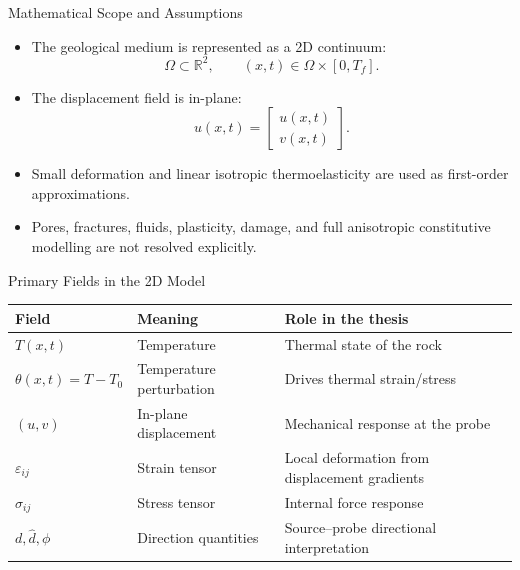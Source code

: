 \documentclass[aspectratio=169,10pt]{beamer}
\begin{document}
\begin{frame}{Mathematical Scope and Assumptions}
  \begin{itemize}
    \item The geological medium is represented as a 2D continuum:
          \[
            \Omega\subset\mathbb{R}^{2},\qquad (x,t)\in\Omega\times[0,T_f].
          \]
    \item The displacement field is in-plane:
          \[
            u(x,t)=
            \begin{bmatrix}
              u(x,t)\\
              v(x,t)
            \end{bmatrix}.
          \]
    \item Small deformation and linear isotropic thermoelasticity are used
          as first-order approximations.
    \item Pores, fractures, fluids, plasticity, damage, and full anisotropic
          constitutive modelling are not resolved explicitly.
  \end{itemize}
\end{frame}

\begin{frame}{Primary Fields in the 2D Model}
  \footnotesize
  \begin{tabular}{@{}lll@{}}
    \toprule
    \textbf{Field} & \textbf{Meaning} & \textbf{Role in the thesis} \\
    \midrule
    $T(x,t)$ & Temperature & Thermal state of the rock \\
    $\theta(x,t)=T-T_0$ & Temperature perturbation & Drives thermal strain/stress \\
    $(u,v)$ & In-plane displacement & Mechanical response at the probe \\
    $\varepsilon_{ij}$ & Strain tensor & Local deformation from displacement gradients \\
    $\sigma_{ij}$ & Stress tensor & Internal force response \\
    $d,\hat d,\phi$ & Direction quantities & Source--probe directional interpretation \\
    \bottomrule
  \end{tabular}
\end{frame}
\end{document}

